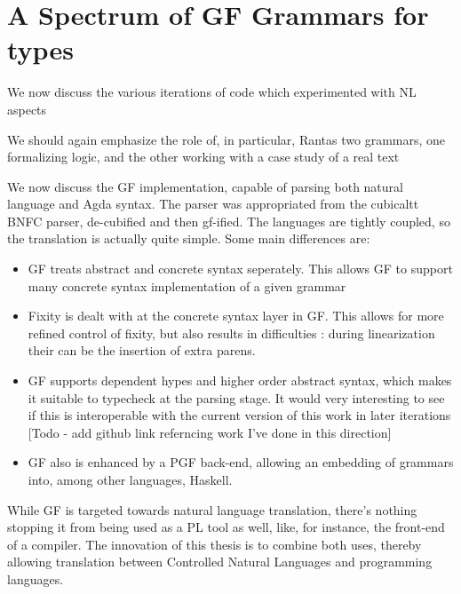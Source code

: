 
\section{A Spectrum of GF Grammars for types}

We now discuss the various iterations of code which experimented with NL aspects

We should again emphasize the role of, in particular, Rantas two grammars, one
formalizing logic, and the other working with a case study of a real text\cite{aarneHott}



We now discuss the GF implementation, capable of parsing both natural language
and Agda syntax. The parser was appropriated from the cubicaltt BNFC parser,
de-cubified and then gf-ified. The languages are tightly coupled, so the
translation is actually quite simple. Some main differences are:

\begin{itemize}[noitemsep]

\item GF treats abstract and concrete syntax seperately. This allows GF to
support many concrete syntax implementation of a given grammar

\item Fixity is dealt with at the concrete syntax layer in GF.  This allows for
more refined control of fixity, but also results in difficulties : during
linearization their can be the insertion of extra parens.

\item GF supports dependent hypes and higher order abstract syntax, which makes
it suitable to typecheck at the parsing stage. It would very interesting to see
if this is interoperable with the current version of this work in later
iterations [Todo - add github link referncing work I've done in this direction]

\item GF also is enhanced by a PGF back-end, allowing an embedding of grammars
into, among other languages, Haskell.

\end{itemize}

While GF is targeted towards natural language translation, there's nothing
stopping it from being used as a PL tool as well, like, for instance, the
front-end of a compiler. The innovation of this thesis is to combine both uses,
thereby allowing translation between Controlled Natural Languages and
programming languages.

